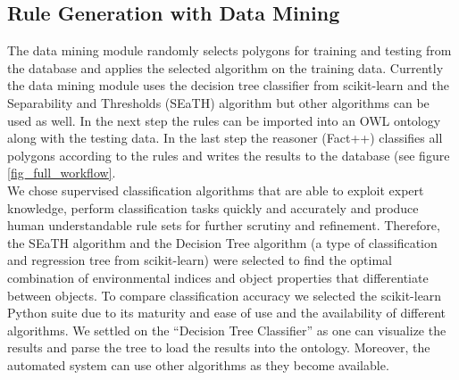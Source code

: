 \documentclass[authoryear, review,12pt,number]{elsarticle}
\begin{document}

\subsection{Rule Generation with Data Mining}
The data mining module randomly selects polygons for training and testing from
the database and applies the selected
algorithm on the training data. 
Currently the data mining
module uses the decision tree classifier from scikit-learn \citep{scikit-learn}
and the Separability and Thresholds (SEaTH) algorithm \citep{Nussbaum2006} but
other algorithms can be used as well. In the next step the rules can be imported
into an OWL ontology along with the testing data. In the last step the reasoner (Fact++)
classifies all polygons according to the rules and writes the results to the
database (see figure \ref{fig_full_workflow}.\\
We chose supervised classification algorithms that are able to exploit expert
knowledge, perform classification tasks quickly and accurately and produce
human understandable rule sets for further scrutiny and refinement. Therefore,
the SEaTH algorithm and the Decision Tree algorithm (a type of classification
and regression tree from scikit-learn) were selected to find the optimal
combination of environmental indices and object properties that differentiate
between objects. 
To compare classification accuracy we selected the scikit-learn Python suite
\citep{scikit-learn} due to its maturity and ease of use and the availability of
different algorithms. We settled on the ``Decision Tree Classifier'' as one can
visualize the results and parse the tree to load the results into the ontology.
Moreover, the automated system can use other algorithms as they become
available.\\
\end{document}

